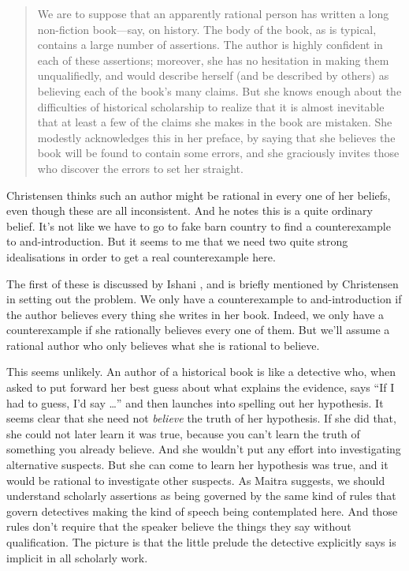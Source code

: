 \documentclass[11pt,]{book}
\begin{document}
\begin{quote}
We are to suppose that an apparently rational person has written a long non-fiction book---say, on history. The body of the book, as is typical, contains a large number of assertions. The author is highly confident in each of these assertions; moreover, she has no hesitation in making them unqualifiedly, and would describe herself (and be described by others) as believing each of the book's many claims. But she knows enough about the difficulties of historical scholarship to realize that it is almost inevitable that at least a few of the claims she makes in the book are mistaken. She modestly acknowledges this in her preface, by saying that she believes the book will be found to contain some errors, and she graciously invites those who discover the errors to set her straight. \citep[ 33-4]{Christensen2005}
\end{quote}

Christensen thinks such an author might be rational in every one of her beliefs, even though these are all inconsistent. And he notes this is a quite ordinary belief. It's not like we have to go to fake barn country to find a
counterexample to and-introduction. But it seems to me that we need two quite strong idealisations in order to get a real counterexample here.

The first of these is discussed by Ishani \citet{Maitra2010}, and is briefly mentioned by Christensen in setting out the problem. We only have a counterexample to and-introduction if the author believes every thing she writes in her book. Indeed, we only have a counterexample if she rationally believes every one of them. But we'll assume a rational author who only believes what she is rational to believe.

This seems unlikely. An author of a historical book is like a detective who, when asked to put forward her best guess about what explains the evidence, says ``If I had to guess, I'd say \ldots{}'' and then launches into spelling out her hypothesis. It seems clear that she need not \emph{believe} the truth of her hypothesis. If she did that, she could not later learn it was true, because you can't learn the truth of something you already believe. And she wouldn't put any effort into investigating alternative suspects. But she can come to learn her hypothesis was true, and it would be rational to investigate other suspects. As Maitra suggests, we should understand scholarly assertions as being governed by the same kind of rules that govern detectives making the kind of speech being contemplated here. And those rules don't require that the speaker believe the things they say without qualification. The picture is that the little prelude the detective explicitly says is implicit in all scholarly work.
\end{document}
